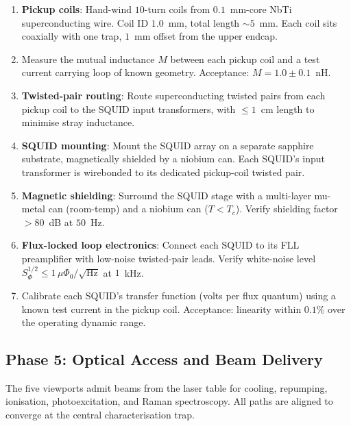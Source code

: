\begin{enumerate}[leftmargin=1.5em]
    \item \textbf{Pickup coils}: Hand-wind $10$-turn coils from $0.1$~mm-core NbTi superconducting wire. Coil ID $1.0$~mm, total length $\sim 5$~mm. Each coil sits coaxially with one trap, $1$~mm offset from the upper endcap.
    \item Measure the mutual inductance $M$ between each pickup coil and a test current carrying loop of known geometry. Acceptance: $M = 1.0 \pm 0.1$~nH.
    \item \textbf{Twisted-pair routing}: Route superconducting twisted pairs from each pickup coil to the SQUID input transformers, with $\le 1$~cm length to minimise stray inductance.
    \item \textbf{SQUID mounting}: Mount the SQUID array on a separate sapphire substrate, magnetically shielded by a niobium can. Each SQUID's input transformer is wirebonded to its dedicated pickup-coil twisted pair.
    \item \textbf{Magnetic shielding}: Surround the SQUID stage with a multi-layer mu-metal can (room-temp) and a niobium can ($T < T_c$). Verify shielding factor $> 80$~dB at $50$~Hz.
    \item \textbf{Flux-locked loop electronics}: Connect each SQUID to its FLL preamplifier with low-noise twisted-pair leads. Verify white-noise level $S_\Phi^{1/2} \le 1\,\mu\Phi_0/\sqrt{\text{Hz}}$ at $1$~kHz.
    \item Calibrate each SQUID's transfer function (volts per flux quantum) using a known test current in the pickup coil. Acceptance: linearity within $0.1$\% over the operating dynamic range.
\end{enumerate}

\subsection{Phase 5: Optical Access and Beam Delivery}
\label{subsec:phase5_optical}

The five viewports admit beams from the laser table for cooling, repumping, ionisation, photoexcitation, and Raman spectroscopy. All paths are aligned to converge at the central characterisation trap.

